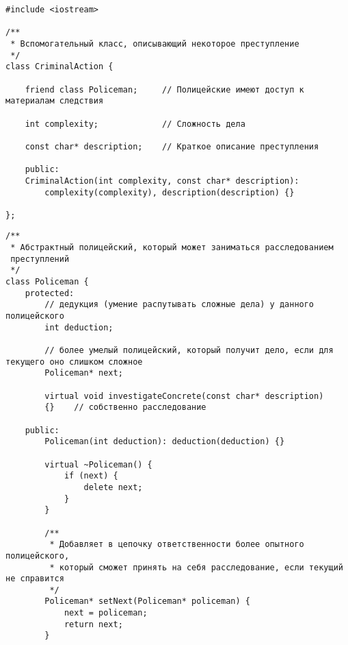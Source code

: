\documentclass{beamer}
\begin{document}
\begin{frame}[fragile]
\begin{verbatim}
#include <iostream>

/**
 * Вспомогательный класс, описывающий некоторое преступление
 */
class CriminalAction {

	friend class Policeman;     // Полицейские имеют доступ к материалам следствия

	int complexity;             // Сложность дела

	const char* description;    // Краткое описание преступления

	public:
	CriminalAction(int complexity, const char* description):
		complexity(complexity), description(description) {}

};
\end{verbatim}
\end{frame}

\begin{frame}[fragile]
\begin{verbatim}
/**
 * Абстрактный полицейский, который может заниматься расследованием
 преступлений
 */
class Policeman {
	protected:
		// дедукция (умение распутывать сложные дела) у данного полицейского
		int deduction;      

		// более умелый полицейский, который получит дело, если для текущего оно слишком сложное
		Policeman* next;    

		virtual void investigateConcrete(const char* description)
		{}    // собственно расследование

	public:
		Policeman(int deduction): deduction(deduction) {}

		virtual ~Policeman() {
			if (next) {
				delete next;
			}
		}

		/**
		 * Добавляет в цепочку ответственности более опытного полицейского,
		 * который сможет принять на себя расследование, если текущий не справится
		 */
		Policeman* setNext(Policeman* policeman) {
			next = policeman;
			return next;
		}
\end{verbatim}
\end{frame}
\end{document}
